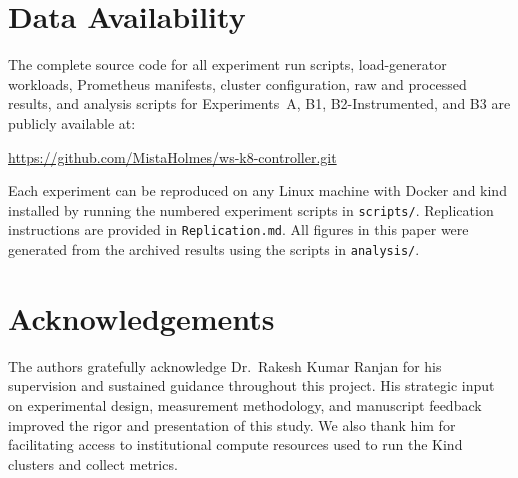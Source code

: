 \documentclass[twocolumn]{svjour3}
\begin{document}
\section*{Data Availability}

The complete source code for all experiment run scripts, load-generator workloads, Prometheus
manifests, cluster configuration, raw and processed results, and analysis scripts for
Experiments~A, B1, B2-Instrumented, and B3 are publicly available at:

\begin{center}
\url{https://github.com/MistaHolmes/ws-k8-controller.git}
\end{center}

Each experiment can be reproduced on any Linux machine with Docker and kind installed by
running the numbered experiment scripts in \texttt{scripts/}. Replication instructions are
provided in \texttt{Replication.md}. All figures in this paper were generated from the
archived results using the scripts in \texttt{analysis/}.

\section*{Acknowledgements}
The authors gratefully acknowledge Dr.\ Rakesh Kumar Ranjan for his supervision and sustained
guidance throughout this project. His strategic input on experimental design, measurement
methodology, and manuscript feedback improved the rigor and presentation of this study.
We also thank him for facilitating access to institutional compute resources used to run the
Kind clusters and collect metrics.





\end{document}
